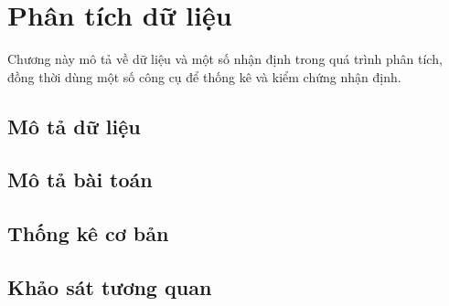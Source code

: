 \chapter{Phân tích dữ liệu}

Chương này mô tả về dữ liệu và một số nhận định trong quá trình phân tích, 
đồng thời dùng một số công cụ để thống kê và kiểm chứng nhận định.

\section{Mô tả dữ liệu}

\section{Mô tả bài toán}

\section{Thống kê cơ bản}

\section{Khảo sát tương quan}




